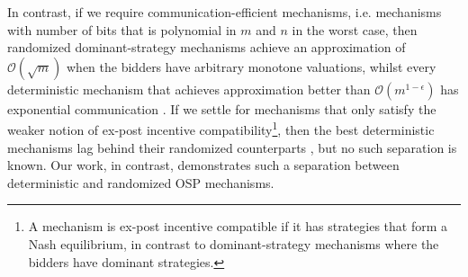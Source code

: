 In contrast, 
 if we require communication-efficient mechanisms, i.e. mechanisms with number of bits that is polynomial in $m$ and $n$ in the worst case, then 
 randomized dominant-strategy mechanisms achieve an approximation of $\mathcal O(\sqrt m)$ when the bidders have arbitrary monotone valuations, whilst every deterministic mechanism that achieves approximation better than $\mathcal O(m^{1-\epsilon})$ has exponential communication \cite{dobzinski2012truthful,DRV22}. If we settle for mechanisms that only satisfy the weaker notion of ex-post incentive compatibility\footnote{A mechanism is ex-post incentive compatible if it has strategies that form a Nash equilibrium, in contrast to dominant-strategy mechanisms where the bidders have dominant strategies.}, then
the best deterministic mechanisms lag behind their randomized counterparts \cite{QW24,AS19,assadi2021improved}, but no such separation is known. Our work, in contrast, demonstrates such a separation between deterministic and randomized OSP mechanisms.






